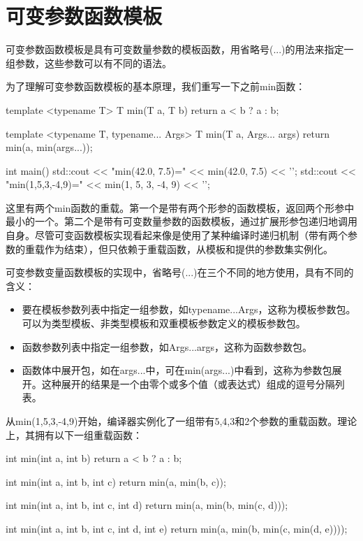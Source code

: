 \section{可变参数函数模板}
可变参数函数模板是具有可变数量参数的模板函数，用省略号(...)的用法来指定一组参数，这些参数可以有不同的语法。

为了理解可变参数函数模板的基本原理，我们重写一下之前min函数：

\begin{cppcode}
template <typename T>
T min(T a, T b)
{
	return a < b ? a : b;
}

template <typename T, typename... Args>
T min(T a, Args... args)
{
	return min(a, min(args...));
}

int main()
{
	std::cout << "min(42.0, 7.5)=" << min(42.0, 7.5)
	          << '\n';
	std::cout << "min(1,5,3,-4,9)=" << min(1, 5, 3, -4, 9)
	          << '\n';
}
\end{cppcode}

这里有两个min函数的重载。第一个是带有两个形参的函数模板，返回两个形参中最小的一个。第二个是带有可变数量参数的函数模板，通过扩展形参包递归地调用自身。尽管可变函数模板实现看起来像是使用了某种编译时递归机制（带有两个参数的重载作为结束），但只依赖于重载函数，从模板和提供的参数集实例化。

可变参数变量函数模板的实现中，省略号(...)在三个不同的地方使用，具有不同的含义：

\begin{itemize}
  \item 要在模板参数列表中指定一组参数，如typename...Args，这称为模板参数包。可以为类型模板、非类型模板和双重模板参数定义的模板参数包。
  \item 函数参数列表中指定一组参数，如Args...args，这称为函数参数包。
  \item 函数体中展开包，如在args...中，可在min(args...)中看到，这称为参数包展开。这种展开的结果是一个由零个或多个值（或表达式）组成的逗号分隔列表。
\end{itemize}

从min(1,5,3,-4,9)开始，编译器实例化了一组带有5,4,3和2个参数的重载函数。理论上，其拥有以下一组重载函数：

\begin{cppcode}
int min(int a, int b)
{
	return a < b ? a : b;
}

int min(int a, int b, int c)
{
	return min(a, min(b, c));
}

int min(int a, int b, int c, int d)
{
	return min(a, min(b, min(c, d)));
}

int min(int a, int b, int c, int d, int e)
{
	return min(a, min(b, min(c, min(d, e))));
}
\end{cppcode}

